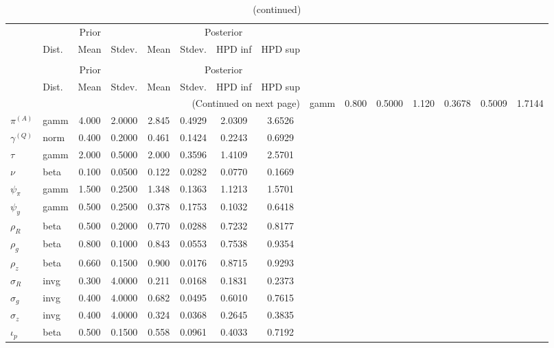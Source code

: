  
\begin{center}
\begin{longtable}{llcccccc} 
\caption{Results from Metropolis-Hastings (parameters)}
 \label{Table:MHPosterior:1}\\
\toprule 
  & \multicolumn{3}{c}{Prior}  &  \multicolumn{4}{c}{Posterior} \\
  \cmidrule(r{.75em}){2-4} \cmidrule(r{.75em}){5-8}
  & Dist. & Mean  & Stdev. & Mean & Stdev. & HPD inf & HPD sup\\
\midrule \endfirsthead 
\caption{(continued)}\\\toprule 
  & \multicolumn{3}{c}{Prior}  &  \multicolumn{4}{c}{Posterior} \\
  \cmidrule(r{.75em}){2-4} \cmidrule(r{.75em}){5-8}
  & Dist. & Mean  & Stdev. & Mean & Stdev. & HPD inf & HPD sup\\
\midrule \endhead 
\bottomrule \multicolumn{8}{r}{(Continued on next page)} \endfoot 
\bottomrule \endlastfoot 
${r_{A}}$ & gamm &   0.800 & 0.5000 &   1.120& 0.3678 &  0.5009 &  1.7144 \\ 
${\pi^{(A)}}$ & gamm &   4.000 & 2.0000 &   2.845& 0.4929 &  2.0309 &  3.6526 \\ 
${\gamma^{(Q)}}$ & norm &   0.400 & 0.2000 &   0.461& 0.1424 &  0.2243 &  0.6929 \\ 
${\tau}$ & gamm &   2.000 & 0.5000 &   2.000& 0.3596 &  1.4109 &  2.5701 \\ 
${\nu}$ & beta &   0.100 & 0.0500 &   0.122& 0.0282 &  0.0770 &  0.1669 \\ 
${\psi_\pi}$ & gamm &   1.500 & 0.2500 &   1.348& 0.1363 &  1.1213 &  1.5701 \\ 
${\psi_y}$ & gamm &   0.500 & 0.2500 &   0.378& 0.1753 &  0.1032 &  0.6418 \\ 
${\rho_R}$ & beta &   0.500 & 0.2000 &   0.770& 0.0288 &  0.7232 &  0.8177 \\ 
${\rho_{g}}$ & beta &   0.800 & 0.1000 &   0.843& 0.0553 &  0.7538 &  0.9354 \\ 
${\rho_z}$ & beta &   0.660 & 0.1500 &   0.900& 0.0176 &  0.8715 &  0.9293 \\ 
${\sigma_R}$ & invg &   0.300 & 4.0000 &   0.211& 0.0168 &  0.1831 &  0.2373 \\ 
${\sigma_{g}}$ & invg &   0.400 & 4.0000 &   0.682& 0.0495 &  0.6010 &  0.7615 \\ 
${\sigma_z}$ & invg &   0.400 & 4.0000 &   0.324& 0.0368 &  0.2645 &  0.3835 \\ 
${\iota_p}$ & beta &   0.500 & 0.1500 &   0.558& 0.0961 &  0.4033 &  0.7192 \\ 
\end{longtable}
 \end{center}
